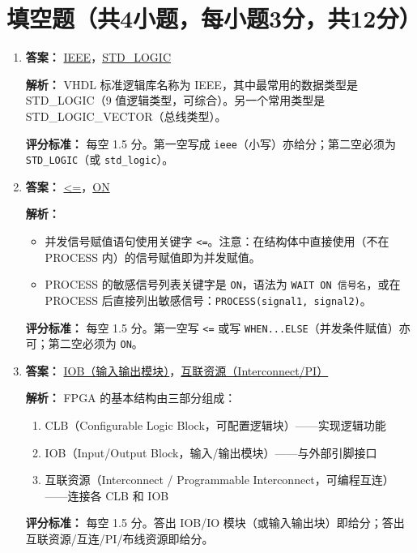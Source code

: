 \section{填空题（共4小题，每小题3分，共12分）}

\begin{enumerate}[label=\arabic*.]

\item \textbf{答案：} \underline{IEEE}，\underline{STD\_LOGIC}

\textbf{解析：} VHDL 标准逻辑库名称为 IEEE，其中最常用的数据类型是 STD\_LOGIC（9 值逻辑类型，可综合）。另一个常用类型是 STD\_LOGIC\_VECTOR（总线类型）。

\textbf{评分标准：} 每空 1.5 分。第一空写成 \texttt{ieee}（小写）亦给分；第二空必须为 \texttt{STD\_LOGIC}（或 \texttt{std\_logic}）。

\item \textbf{答案：} \underline{<=}，\underline{ON}

\textbf{解析：}
\begin{itemize}
    \item 并发信号赋值语句使用关键字 \texttt{<=}。注意：在结构体中直接使用（不在 PROCESS 内）的信号赋值即为并发赋值。
    \item PROCESS 的敏感信号列表关键字是 \texttt{ON}，语法为 \texttt{WAIT ON 信号名}，或在 PROCESS 后直接列出敏感信号：\texttt{PROCESS(signal1, signal2)}。
\end{itemize}

\textbf{评分标准：} 每空 1.5 分。第一空写 \texttt{<=} 或写 \texttt{WHEN...ELSE}（并发条件赋值）亦可；第二空必须为 \texttt{ON}。

\item \textbf{答案：} \underline{IOB（输入输出模块）}，\underline{互联资源（Interconnect/PI）}

\textbf{解析：} FPGA 的基本结构由三部分组成：
\begin{enumerate}
    \item CLB（Configurable Logic Block，可配置逻辑块）——实现逻辑功能
    \item IOB（Input/Output Block，输入/输出模块）——与外部引脚接口
    \item 互联资源（Interconnect / Programmable Interconnect，可编程互连）——连接各 CLB 和 IOB
\end{enumerate}

\textbf{评分标准：} 每空 1.5 分。答出 IOB/IO 模块（或输入输出块）即给分；答出互联资源/互连/PI/布线资源即给分。


\end{enumerate}
